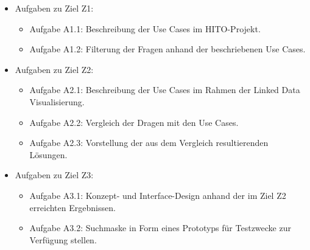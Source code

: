 \begin{itemize}
\item Aufgaben zu Ziel Z1:
	\begin{itemize}
	\item Aufgabe A1.1: Beschreibung der Use Cases im HITO-Projekt.
	\item Aufgabe A1.2: Filterung der Fragen anhand der beschriebenen Use Cases.
	\end{itemize}
\item Aufgaben zu Ziel Z2:
	\begin{itemize}
	\item Aufgabe A2.1: Beschreibung der Use Cases im Rahmen der Linked Data Visualisierung.
	\item Aufgabe A2.2: Vergleich der Dragen mit den Use Cases.
	\item Aufgabe A2.3: Vorstellung der aus dem Vergleich resultierenden Lösungen.
	\end{itemize}
\item Aufgaben zu Ziel Z3:
	\begin{itemize}
	\item Aufgabe A3.1: Konzept- und Interface-Design anhand der im Ziel Z2 erreichten Ergebnissen.
	\item Aufgabe A3.2: Suchmaske in Form eines Prototyps für Testzwecke zur Verfügung stellen.
	\end{itemize}
\end{itemize}






